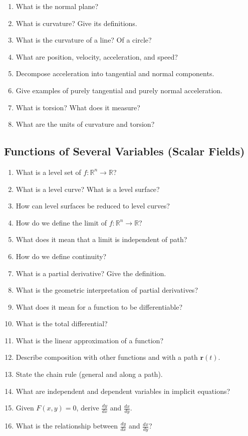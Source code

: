 \begin{enumerate}[resume]
  \item What is the normal plane?
  \item What is curvature? Give its definitions.
  \item What is the curvature of a line? Of a circle?
  \item What are position, velocity, acceleration, and speed?
  \item Decompose acceleration into tangential and normal components.
  \item Give examples of purely tangential and purely normal acceleration.
  \item What is torsion? What does it measure?
  \item What are the units of curvature and torsion?
\end{enumerate}

\subsection{Functions of Several Variables (Scalar Fields)}

\begin{enumerate}[resume]
  \item What is a level set of \(f:\mathbb{R}^{n} \to \mathbb{R}\)?
  \item What is a level curve? What is a level surface?
  \item How can level surfaces be reduced to level curves?
  \item How do we define the limit of \(f:\mathbb{R}^{n} \to \mathbb{R}\)?
  \item What does it mean that a limit is independent of path?
  \item How do we define continuity?
  \item What is a partial derivative? Give the definition.
  \item What is the geometric interpretation of partial derivatives?
  \item What does it mean for a function to be differentiable?
  \item What is the total differential?
  \item What is the linear approximation of a function?
  \item Describe composition with other functions and with a path \(\mathbf{r}(t)\).
  \item State the chain rule (general and along a path).
  \item What are independent and dependent variables in implicit equations?
  \item Given \(F(x,y)=0\), derive \(\frac{dy}{dx}\) and \(\frac{dx}{dy}\).
  \item What is the relationship between \(\frac{dy}{dx}\) and \(\frac{dx}{dy}\)?
\end{enumerate}

